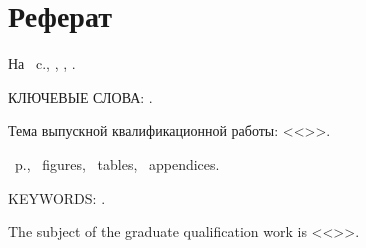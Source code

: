 \chapter*[Count-me]{Реферат} %
\thispagestyle{empty}%
%
%



На ~c.,  
,
,
.  

{\MakeUppercase{Ключевые слова: \keywordsRu}.} %

Тема выпускной квалификационной работы: <<\thesisTitle>>.


\abstractRu



\printTheAbstract %


~p., 
~figures, 
~tables,
~appendices.

{\MakeUppercase{Keywords: \keywordsEn}.} %
	
The subject of the graduate qualification work is <<\thesisTitleEn>>.
	
	
\abstractEn %
	


\thispagestyle{empty}
%
